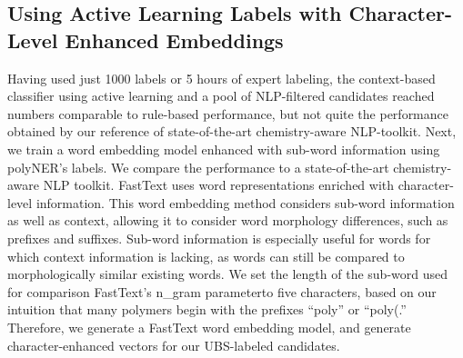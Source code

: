 \subsection{Using Active Learning Labels with Character-Level Enhanced Embeddings}
Having used just 1000 labels or 5 hours of expert labeling, the context-based classifier using active learning and a pool of NLP-filtered candidates reached numbers comparable to rule-based performance, but not quite the performance obtained by our reference of state-of-the-art chemistry-aware NLP-toolkit.
Next, we train a word embedding model enhanced with sub-word information using polyNER's labels. 
We compare the performance to a state-of-the-art chemistry-aware NLP toolkit. %
FastText uses word representations enriched with character-level information.
This word embedding method considers sub-word information as well as
context, allowing it to consider word morphology differences, such as prefixes
and suffixes. Sub-word information is especially useful for words for which
context information is lacking, as words can still be compared to morphologically similar
existing words. We set the length of the sub-word used for comparison\textemdash
FastText's n_gram parameter\textemdash to five characters, based on our intuition that
many polymers begin with the prefixes ``poly'' or ``poly(.'' 
Therefore, we generate a FastText word embedding model, and generate character-enhanced vectors for our UBS-labeled candidates.


